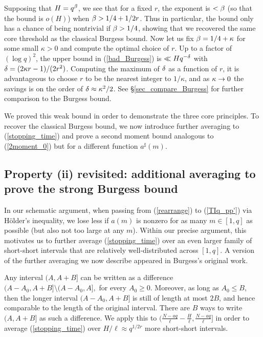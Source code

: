 \documentclass[oneside,11pt]{amsart}
\begin{document}
 
 
 
Supposing that $H = q^\beta$, we see that for a fixed $r$, the exponent is $< \beta$ (so that the bound is $o(H)$) when $\beta > 1/4 + 1/2r$. Thus in particular, the bound only has a chance of being nontrivial if $\beta> 1/4$, showing that we recovered the same core threshold as the classical Burgess bound. Now let us fix $\beta = 1/4 + \kappa$ for some small $\kappa>0$
and compute the optimal choice of $r$. Up to a factor of $(\log q)^2$, the upper bound  in (\ref{bad_Burgess}) is $\ll Hq^{-\delta}$ with $\delta = (2\kappa r-1)/(2r^2)$. Computing the maximum of $\delta$ as a function of $r$, it is advantageous to choose $r$ to be the nearest integer to $1/\kappa$, and as $\kappa \rightarrow 0$ the savings is on the order of $\delta \approx \kappa^2/2$.   
 See \S \ref{sec_compare_Burgess} for further comparison to the Burgess bound.

 
 
 
  
 
   We proved this weak bound in order to demonstrate the three core principles. 
 To recover the classical Burgess bound, we now introduce further averaging to (\ref{stopping_time}) and prove a second moment bound analogous to (\ref{2moment_0}) but for a  different function $a^\sharp(m)$.  

\subsection{Property (ii) revisited: additional averaging to prove the strong Burgess bound}

In our schematic argument, when passing from (\ref{rearrange}) to (\ref{TIq_pp'}) via H\"older's inequality, we lose less if $a(m)$ is nonzero for as many $m \in [1,q]$ as possible (but also not too large at any $m$). 
Within our precise argument, this motivates us to   further average (\ref{stopping_time}) over an even larger family of short-short intervals that are relatively well-distributed across $[1,q]$. A version of the further averaging we now describe  appeared in Burgess's original work.  

Any interval $(A, A+B]$ can be written as a difference $(A-A_0,A+B]\setminus (A-A_0,A],$ for every $A_0 \geq 0$. Moreover, as long as $A_0 \leq B$, then the longer interval $(A-A_0,A+B]$ is still of length at most $2B$, and hence comparable to the length of the original interval. There are $B$ ways to write $(A,A+B]$ as such a difference. We
apply this to $( \frac{N-aq}{\ell} - \frac{H}{\ell}, \frac{N-aq}{\ell}]$ in order to average (\ref{stopping_time}) over $H/\ell \approx q^{1/2r}$ more short-short intervals. 
\end{document}
